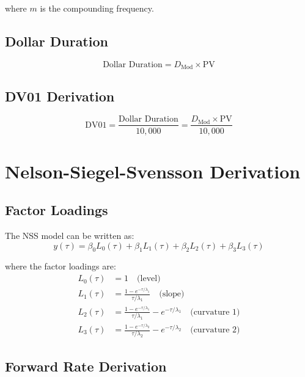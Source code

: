 \documentclass[12pt,a4paper]{report}
\newcommand{\pv}{\text{PV}}
\begin{document}
where $m$ is the compounding frequency.

\subsection{Dollar Duration}

\begin{equation}
    \text{Dollar Duration} = D_{\text{Mod}} \times \pv
\end{equation}

\subsection{DV01 Derivation}

\begin{equation}
    \text{DV01} = \frac{\text{Dollar Duration}}{10{,}000} = \frac{D_{\text{Mod}} \times \pv}{10{,}000}
\end{equation}

\section{Nelson-Siegel-Svensson Derivation}

\subsection{Factor Loadings}

The NSS model can be written as:
\begin{equation}
    y(\tau) = \beta_0 L_0(\tau) + \beta_1 L_1(\tau) + \beta_2 L_2(\tau) + \beta_3 L_3(\tau)
\end{equation}

where the factor loadings are:
\begin{align}
    L_0(\tau) &= 1 \quad \text{(level)} \\
    L_1(\tau) &= \frac{1-e^{-\tau/\lambda_1}}{\tau/\lambda_1} \quad \text{(slope)} \\
    L_2(\tau) &= \frac{1-e^{-\tau/\lambda_1}}{\tau/\lambda_1} - e^{-\tau/\lambda_1} \quad \text{(curvature 1)} \\
    L_3(\tau) &= \frac{1-e^{-\tau/\lambda_2}}{\tau/\lambda_2} - e^{-\tau/\lambda_2} \quad \text{(curvature 2)}
\end{align}

\subsection{Forward Rate Derivation}
\end{document}
